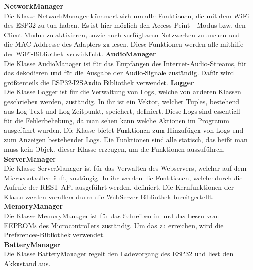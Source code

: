 \documentclass[11pt, twoside]{article}
\begin{document}
\textbf{NetworkManager} \\
Die Klasse NetworkManager kümmert sich um alle Funktionen, die mit dem WiFi des ESP32 zu tun haben. Es ist hier möglich den Access Point - Modus bzw. den Client-Modus zu aktivieren, sowie nach verfügbaren Netzwerken zu suchen und die MAC-Addresse des Adapters zu lesen. Diese Funktionen werden alle mithilfe der WiFi-Bibliothek verwirklicht.
\vspace{4mm}\newline
\textbf{AudioManager} \\
Die Klasse AudioManager ist für das Empfangen des Internet-Audio-Streams, für das dekodieren und für die Ausgabe der Audio-Signale zuständig. Dafür wird größtenteils die ESP32-I2SAudio Bibliothek verwendet.
\vspace{4mm}\newline
\textbf{Logger} \\
Die Klasse Logger ist für die Verwaltung von Logs, welche von anderen Klassen geschrieben werden, zuständig. In ihr ist ein Vektor, welcher Tuples, bestehend aus Log-Text und Log-Zeitpunkt, speichert, definiert. Diese Logs sind essentiell für die Fehlerbehebung, da man sehen kann welche Aktionen im Programm ausgeführt wurden. Die Klasse bietet Funktionen zum Hinzufügen von Logs und zum Anzeigen bestehender Logs. Die Funktionen sind alle statisch, das heißt man muss kein Objekt dieser Klasse erzeugen, um die Funktionen auszuführen.
\vspace{4mm}\newline
\textbf{ServerManager} \\
Die Klasse ServerManager ist für das Verwalten des Webservers, welcher auf dem Microcontroller läuft, zustängig. In ihr werden die Funktionen, welche durch die Aufrufe der REST-API ausgeführt werden, definiert. Die Kernfunktionen der Klasse werden vorallem durch die WebServer-Bibliothek bereitgestellt.
\vspace{4mm}\newline
\textbf{MemoryManager} \\
Die Klasse MemoryManager ist für das Schreiben in und das Lesen vom EEPROMs des Microcontrollers zuständig. Um das zu erreichen, wird die Preferences-Bibliothek verwendet. \newline \\
\textbf{BatteryManager} \\
Die Klasse BatteryManager regelt den Ladevorgang des ESP32 und liest den Akkustand aus.
\end{document}
